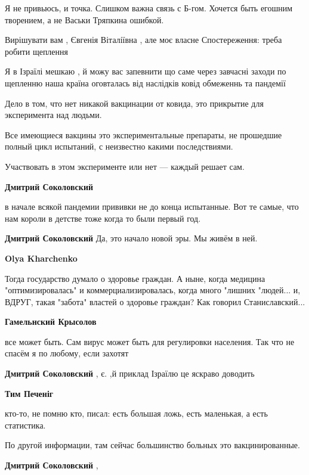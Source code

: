 \begin{itemize}
Я не привьюсь, и точка. Слишком важна связь с Б-гом. Хочется быть егошним творением, а не Васьки Тряпкина ошибкой.

Вирішувати вам , Євгенія Віталіївна , але моє власне Спостереження: треба робити щеплення


Я в Ізраїлі мешкаю , й можу вас запевнити що саме через завчасні заходи по
щепленню наша країна оговталась від наслідків ковід обмеженнь та пандемії


Дело в том, что нет никакой вакцинации от ковида, это прикрытие для
эксперимента над людьми.

Все имеющиеся вакцины это экспериментальные препараты, не прошедшие полный цикл
испытаний, с неизвестно какими последствиями.

Участвовать в этом эксперименте или нет — каждый решает сам.

\begin{itemize} %
\textbf{Дмитрий Соколовский} 

в начале всякой пандемии прививки не до конца испытанные. Вот те самые, что нам
короли в детстве тоже когда то были первый год.

\textbf{Дмитрий Соколовский} Да, это начало новой эры. Мы живём в ней.

\textbf{Olya Kharchenko} 

Тогда государство думало о здоровье граждан. А ныне, когда медицина
"оптимизировалась" и коммерциализировалась, когда много "лишних "людей... и,
ВДРУГ, такая "забота" властей о здоровье граждан? Как говорил Станиславский...

\textbf{Гамельнский Крысолов} 

все может быть. Сам вирус может быть для регулировки населения. Так что не
спасём я по любому, если захотят

\textbf{Дмитрий Соколовский} , є. ,й приклад Ізраїлю це яскраво доводить

\textbf{Тим Печеніг} 

кто-то, не помню кто, писал: есть большая ложь, есть маленькая, а есть
статистика.

По другой информации, там сейчас большинство больных это вакцинированные.

\textbf{Дмитрий Соколовский} ,


\end{itemize}
\end{itemize}
